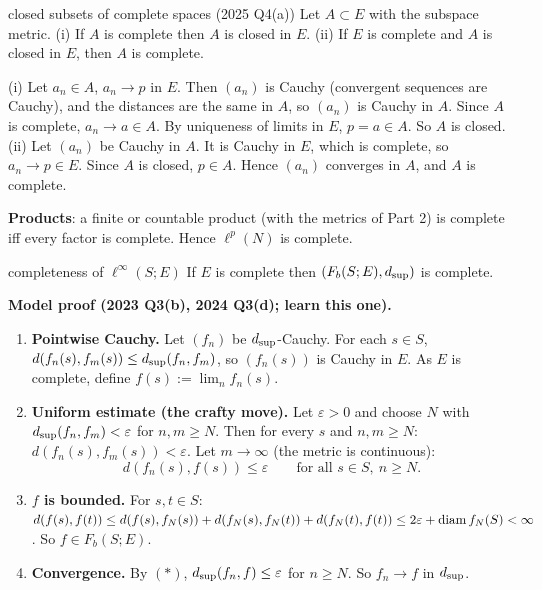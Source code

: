 \begin{thm}{closed subsets of complete spaces (2025 Q4(a))}
Let $A\subset E$ with the subspace metric. (i) If $A$ is complete then $A$ is closed in $E$.
(ii) If $E$ is complete and $A$ is closed in $E$, then $A$ is complete.
\end{thm}
\begin{answer}
(i) Let $a_n\in A$, $a_n\to p$ in $E$. Then $(a_n)$ is Cauchy (convergent sequences are
Cauchy), and the distances are the same in $A$, so $(a_n)$ is Cauchy in $A$. Since $A$ is
complete, $a_n\to a\in A$. By uniqueness of limits in $E$, $p=a\in A$. So $A$ is closed.\\
(ii) Let $(a_n)$ be Cauchy in $A$. It is Cauchy in $E$, which is complete, so $a_n\to p\in E$.
Since $A$ is closed, $p\in A$. Hence $(a_n)$ converges in $A$, and $A$ is complete.
\end{answer}
\textbf{Products}: a finite or countable product (with the metrics of Part 2) is complete iff
every factor is complete. Hence $\ell^p(N)$ is complete.

\begin{thm}{completeness of $\ell^\infty(S;E)$}
If $E$ is complete then $(F_b(S;E),d_{\sup})$ is complete.
\end{thm}
\begin{answer}
\textbf{Model proof (2023 Q3(b), 2024 Q3(d); learn this one).}
\begin{enumerate}
\item \textbf{Pointwise Cauchy.} Let $(f_n)$ be $d_{\sup}$-Cauchy. For each $s\in S$,
  $d(f_n(s),f_m(s))\le d_{\sup}(f_n,f_m)$, so $(f_n(s))$ is Cauchy in $E$. As $E$ is complete,
  define $f(s):=\lim_n f_n(s)$.
\item \textbf{Uniform estimate (the crafty move).} Let $\varepsilon>0$ and choose $N$ with
  $d_{\sup}(f_n,f_m)<\varepsilon$ for $n,m\ge N$. Then for every $s$ and $n,m\ge N$:
  $d(f_n(s),f_m(s))<\varepsilon$. Let $m\to\infty$ (the metric is continuous):
  \[d(f_n(s),f(s))\le\varepsilon\qquad\text{for all }s\in S,\ n\ge N.\tag{$*$}\]
\item \textbf{$f$ is bounded.} For $s,t\in S$:
  $d(f(s),f(t))\le d(f(s),f_N(s))+d(f_N(s),f_N(t))+d(f_N(t),f(t))\le2\varepsilon+\operatorname{diam} f_N(S)<\infty$.
  So $f\in F_b(S;E)$.
\item \textbf{Convergence.} By $(*)$, $d_{\sup}(f_n,f)\le\varepsilon$ for $n\ge N$. So $f_n\to f$ in
  $d_{\sup}$.
\end{enumerate}
\end{answer}

